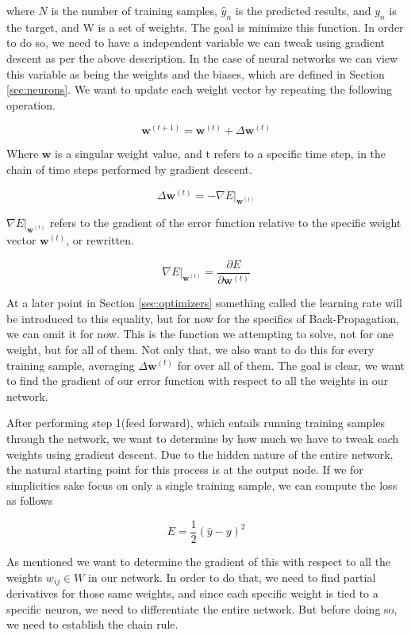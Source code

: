 where $N$ is the number of training samples, $\hat{y}_n$ is the predicted
results, and $y_n$ is the target, and W is a set of weights. The goal is
minimize this function. In order to do so, we need to have a independent
variable we can tweak using gradient descent as per the above description. In
the case of neural networks we can view this variable as being the weights and
the biases, which are defined in Section \ref{sec:neurons}. We want to update
each weight vector by repeating the following operation.

\begin{equation}\label{eq:update}
    \mathbf{w}^{(t+1)} = \mathbf{w}^{(t)} + \Delta \mathbf{w}^{(t)}
\end{equation}

Where $\mathbf{w}$ is a singular weight value, and t refers to a specific time
step, in the chain of time steps performed by gradient descent.

\begin{equation}
    \Delta \mathbf{w}^{(t)} = -\nabla E|_{\mathbf{w}^{(t)}}
\end{equation}

$\nabla E|_{\mathbf{w}^{(t)}}$ refers to the gradient of the error function
relative to the specific weight vector $\mathbf{w}^{(t)}$, or rewritten.

$$
\nabla E|_{\mathbf{w}^{(t)}} = \frac{\partial E}{\partial \mathbf{w}^{(t)}}
$$

At a later point in Section \ref{sec:optimizers} something called the learning
rate will be introduced to this equality, but for now for the specifics of
Back-Propagation, we can omit it for now. This is the function we attempting to
solve, not for one weight, but for all of them. Not only that, we also want to
do this for every training sample, averaging $\Delta \mathbf{w}^{(t)}$ for over all
of them. The goal is clear, we want to find the gradient of our error
function with respect to all the weights in our network.

After performing step 1(feed forward), which entails running training samples
through the network, we want to determine by how much we have to tweak each
weights using gradient descent. Due to the hidden nature of the entire network,
the natural starting point for this process is at the output node. If we for
simplicities sake focus on only a single training sample, we can compute the
loss as follows

$$
E = \frac{1}{2}(\hat{y} - y)^2
$$

As mentioned we want to determine the gradient of this with respect to all the
weights $w_{ij} \in W$ in our network. In order to do that, we need to find
partial derivatives for those same weights, and since each specific weight is
tied to a specific neuron, we need to differentiate the entire network. But
before doing so, we need to establish the chain rule.

